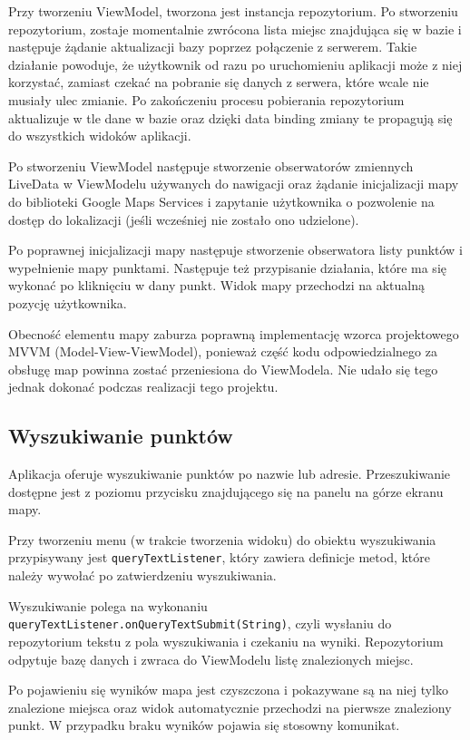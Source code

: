 \documentclass[polish,polish,a4paper,12pt]{article}
\begin{document}
	Przy tworzeniu ViewModel, tworzona jest instancja repozytorium. Po stworzeniu repozytorium, zostaje momentalnie zwrócona lista miejsc znajdująca się w bazie i następuje żądanie aktualizacji bazy poprzez połączenie z serwerem. Takie działanie powoduje, że użytkownik od razu po uruchomieniu aplikacji może z niej korzystać, zamiast czekać na pobranie się danych z serwera, które wcale nie musiały ulec zmianie. Po zakończeniu procesu pobierania repozytorium aktualizuje w tle dane w bazie oraz dzięki data binding zmiany te propagują się do wszystkich widoków aplikacji.

	Po stworzeniu ViewModel następuje stworzenie obserwatorów zmiennych LiveData w ViewModelu używanych do nawigacji oraz żądanie inicjalizacji mapy do biblioteki Google Maps Services i zapytanie użytkownika o pozwolenie na dostęp do lokalizacji (jeśli wcześniej nie zostało ono udzielone).

	Po poprawnej inicjalizacji mapy następuje stworzenie obserwatora listy punktów i wypełnienie mapy punktami. Następuje też przypisanie działania, które ma się wykonać po kliknięciu w dany punkt. Widok mapy przechodzi na aktualną pozycję użytkownika.

	Obecność elementu mapy zaburza poprawną implementację wzorca projektowego MVVM (Model-View-ViewModel), ponieważ część kodu odpowiedzialnego za obsługę map powinna zostać przeniesiona do ViewModela. Nie udało się tego jednak dokonać podczas realizacji tego projektu.

	\subsection{Wyszukiwanie punktów}

	Aplikacja oferuje wyszukiwanie punktów po nazwie lub adresie. Przeszukiwanie dostępne jest z poziomu przycisku znajdującego się na panelu na górze ekranu mapy.

	Przy tworzeniu menu (w trakcie tworzenia widoku) do obiektu wyszukiwania przypisywany jest \texttt{queryTextListener}, który zawiera definicje metod, które należy wywołać po zatwierdzeniu wyszukiwania.

	Wyszukiwanie polega na wykonaniu \texttt{queryTextListener.onQueryTextSubmit(String)}, czyli wysłaniu do repozytorium tekstu z pola wyszukiwania i czekaniu na wyniki. Repozytorium odpytuje bazę danych i zwraca do ViewModelu listę znalezionych miejsc.

	Po pojawieniu się wyników mapa jest czyszczona i pokazywane są na niej tylko znalezione miejsca oraz widok automatycznie przechodzi na pierwsze znaleziony punkt. W przypadku braku wyników pojawia się stosowny komunikat.
\end{document}
